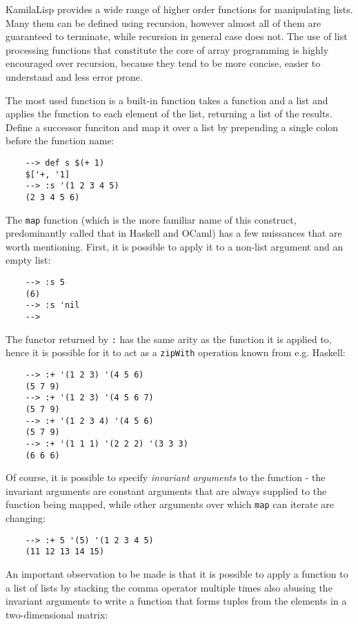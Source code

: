 KamilaLisp provides a wide range of higher order functions for manipulating lists. Many them can be defined using recursion, however almost all of them are guaranteed to terminate, while recursion in general case does not. The use of list processing functions that constitute the core of array programming is highly encouraged over recursion, because they tend to be more concise, easier to understand and less error prone.

The most used function is a built-in function takes a function and a list and applies the function to each element of the list, returning a list of the results. Define a successor funciton and map it over a list by prepending a single colon before the function name:

\begin{Verbatim}
    --> def s $(+ 1)
    $['+, '1]
    --> :s '(1 2 3 4 5)
    (2 3 4 5 6)
\end{Verbatim}

The \verb|map| function (which is the more familiar name of this construct, predominantly called that in Haskell and OCaml) has a few nuissances that are worth mentioning. First, it is possible to apply it to a non-list argument and an empty list:

\begin{Verbatim}
    --> :s 5
    (6)
    --> :s 'nil
    -->
\end{Verbatim}

The functor returned by \verb|:| has the same arity as the function it is applied to, hence it is possible for it to act as a \verb|zipWith| operation known from e.g. Haskell:

\begin{Verbatim}
    --> :+ '(1 2 3) '(4 5 6)
    (5 7 9)
    --> :+ '(1 2 3) '(4 5 6 7)
    (5 7 9)
    --> :+ '(1 2 3 4) '(4 5 6)
    (5 7 9)
    --> :+ '(1 1 1) '(2 2 2) '(3 3 3)
    (6 6 6)
\end{Verbatim}

Of course, it is possible to specify \textit{invariant arguments} to the function - the invariant arguments are constant arguments that are always supplied to the function being mapped, while other arguments over which \verb|map| can iterate are changing:

\begin{Verbatim}
    --> :+ 5 '(5) '(1 2 3 4 5)
    (11 12 13 14 15)
\end{Verbatim}

An important observation to be made is that it is possible to apply a function to a list of lists by stacking the comma operator multiple times also abusing the invariant arguments to write a function that forms tuples from the elements in a two-dimensional matrix:

